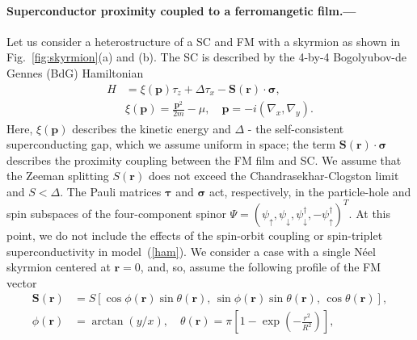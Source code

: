\documentclass[twocolumn,showpacs,floatfix,longbibliography]{revtex4-1}
\begin{document}
\paragraph*{Superconductor proximity coupled to a ferromangetic film.--- }  \label{sec:model}
Let us consider a heterostructure of a SC and FM with a skyrmion as shown in Fig.~\ref{fig:skyrmion}(a) and (b). The SC is described by the 4-by-4 Bogolyubov-de Gennes (BdG) Hamiltonian
\begin{align}
 H &= \xi(\bm p)\tau_z+\Delta \tau_x - \bm S(\bm r)\cdot\bm\sigma, \label{ham} \\
   & \xi(\bm p) = \frac{\bm p^2}{2m}-\mu,\quad \bm p = -i(\nabla_x,\nabla_y).
\end{align}
Here, $\xi(\bm p)$ describes the kinetic energy and $\Delta$ - the self-consistent superconducting gap, which we assume uniform in space; the term $\bm S(\bm r)\cdot\bm\sigma$ describes the proximity coupling between the FM film and SC. We assume that the Zeeman splitting $S(\bm r)$ does not exceed the Chandrasekhar-Clogston limit and $S<\Delta$. The Pauli matrices $\bm \tau$ and $\bm \sigma$ act, respectively, in the particle-hole and spin subspaces of the four-component spinor $\Psi = (\psi_\uparrow,\psi_\downarrow,\psi^\dagger_\downarrow,-\psi^\dagger_\uparrow)^T$. At this point, we do not include the effects of the spin-orbit coupling or spin-triplet superconductivity \cite{Note1} in model~(\ref{ham}). We consider a case with a single N\'eel skyrmion centered at $\bm r = 0$, and, so, assume the following profile of the FM vector
\begin{align}
	\bm S(\bm r) &= S\left[ \cos\phi(\bm r) \sin\theta(\bm r),\, \sin\phi(\bm r)\sin\theta(\bm r),\,\cos\theta(\bm r)\right],\nonumber  \\
	\phi(\bm r) &= \arctan(y/x),\quad \theta(\bm r) = \pi \left[ 1-\exp\left( -\frac{r^2}{R^2} \right) \right], \label{conf}	
\end{align}
\end{document}
